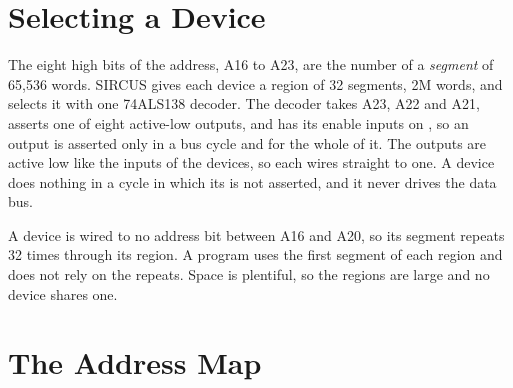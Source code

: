 \section{Selecting a Device}
\label{sec:selecting}

The eight high bits of the address, A16 to A23, are the number of a \emph{segment} of 65,536 words. SIRCUS gives each
device a region of 32 segments, 2M words, and selects it with one 74ALS138 decoder. The decoder takes A23, A22 and A21,
asserts one of eight active-low outputs, and has its enable inputs on , so an output is asserted only in
a bus cycle and for the whole of it. The outputs are active low like the  inputs of the devices, so each
wires straight to one. A device does nothing in a cycle in which its  is not asserted, and it never
drives the data bus.

A device is wired to no address bit between A16 and A20, so its segment repeats 32 times through its region. A program
uses the first segment of each region and does not rely on the repeats. Space is plentiful, so the regions are large
and no device shares one.

\section{The Address Map}
\label{sec:address-map}

